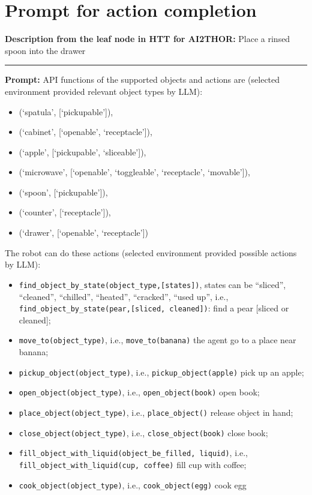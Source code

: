 \documentclass{article}
\begin{document}
\section*{Prompt for action completion}
\textbf{Description from the leaf node in HTT for AI2THOR:} Place a rinsed spoon into the drawer

\noindent\rule{16cm}{0.4pt}

\textbf{Prompt:}
API functions of the supported objects and actions are {\color{blue}(selected environment provided relevant object types by LLM)}:
\begin{itemize}
\item (`spatula', [`pickupable']), 
\item (`cabinet', [`openable', `receptacle']), 
\item (`apple', [`pickupable', `sliceable']), 
\item (`microwave', [`openable', `toggleable', `receptacle', `movable']), 
\item (`spoon', [`pickupable']), 
\item (`counter', [`receptacle']), 
\item (`drawer', [`openable', `receptacle'])
\end{itemize}

The robot can do these actions {\color{blue}(selected environment provided possible actions by LLM):}
\begin{itemize}
    \item \verb|find_object_by_state(object_type,[states])|,  states can be ``sliced'', ``cleaned'', ``chilled'', ``heated'', ``cracked'', ``used up'', i.e.,  \verb|find_object_by_state(pear,[sliced, cleaned])|: find a pear [sliced or cleaned]; 
    \item \verb|move_to(object_type)|, i.e., \verb|move_to(banana)| the agent go to a place near banana; 
    \item \verb|pickup_object(object_type)|, i.e., \verb|pickup_object(apple)| pick up an apple; 
    \item \verb|open_object(object_type)|, i.e., \verb|open_object(book)| open book; 
    \item \verb|place_object(object_type)|, i.e., \verb|place_object()| release object in hand; 
    \item \verb|close_object(object_type)|, i.e., \verb|close_object(book)| close book; 
    \item \verb|fill_object_with_liquid(object_be_filled, liquid)|, i.e., \verb|fill_object_with_liquid(cup, coffee)| fill cup with coffee; 
    \item \verb|cook_object(object_type)|, i.e., \verb|cook_object(egg)| cook egg
\end{itemize}
\end{document}
